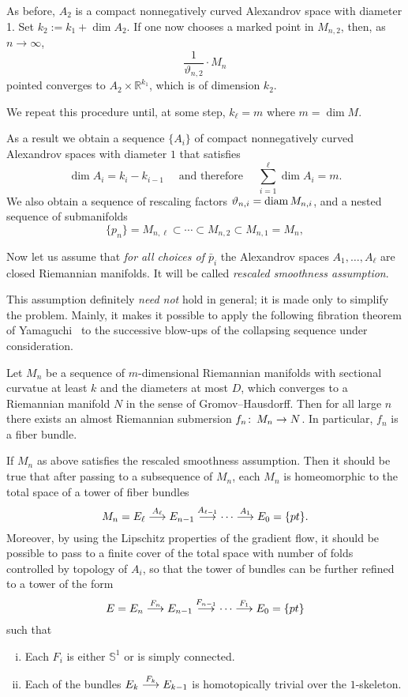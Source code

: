 \documentclass{amsart}
\begin{document}
As before, $A_2$ is a compact nonnegatively curved Alexandrov space with diameter 1.
Set $k_2:=k_1+\dim A_2$.
If one now chooses a marked point in $M_{n,2}$,
then, as $n\to\infty$,
$$\frac{1}{\vartheta_{n,2}}{\cdot} M_{n}$$ pointed converges to $A_2\times\mathbb{R}^{k_1}$,
which is of dimension $k_2$.

We repeat this procedure until, at some step, $k_\ell=m$ where $m=\dim M$.

\medskip

As a result we obtain a sequence $\{A_i\}$ of compact nonnegatively curved Alexandrov spaces
with diameter $1$ that satisfies
$$\dim A_i=k_i-k_{i-1} 
\quad\text{ and therefore }\quad
\sum_{i=1}^\ell\dim A_i=m.$$
We also obtain
a sequence of rescaling factors $\vartheta_{n,i}=\operatorname{\rm diam} M_{n,i}$,
and  a nested sequence of submanifolds
$$\{p_n\}=M_{n,\ell}\subset \cdots \subset M_{n,2}\subset M_{n,1}=M_n,$$

Now let us assume that \emph{for all choices of $\bar p_i$}
the Alexandrov spaces $A_1,\dots, A_\ell$ are closed  Riemannian manifolds.
It will be called \emph{rescaled smoothness assumption}.

This assumption definitely \emph{need not} hold in general;
it is made only to simplify the problem.
Mainly, it makes it possible to apply the following fibration theorem of Yamaguchi~\cite{Yam} to the successive blow-ups of the collapsing sequence under consideration.

\begin{thm}
Let $M_n$ be a sequence of $m$-dimensional Riemannian manifolds with sectional curvatue at least $k$ and the diameters at most $D$, which converges to a Riemannian manifold $N$ in the sense of Gromov--Hausdorff.
Then for all large $n$ there exists an almost Riemannian submersion $f_n\colon\thinspace M_n\to N$.
In particular, $f_n$ is a fiber bundle.
\end{thm}

If $M_n$ as above satisfies the rescaled smoothness assumption.
Then it should be true that after passing to a subsequence of $M_n$,
each $M_n$ is homeomorphic to the total space of a tower of fiber bundles
\[
M_n=E_\ell\buildrel {A_\ell}\over \longrightarrow E_{n-1}\buildrel {A_{\ell-1}}\over\longrightarrow\dots\buildrel {A_1}\over\longrightarrow E_0=\{pt\}.
\]
Moreover, by using the Lipschitz properties of the gradient flow,
it should be possible to pass to a finite cover of the total space with number of folds controlled by topology of $A_i$, so that the tower of bundles can be
further refined  to a tower of the form
\[
E=E_n\buildrel {F_n}\over \longrightarrow E_{n-1}\buildrel {F_{n-1}}\over\longrightarrow\dots\buildrel {F_1}\over\longrightarrow E_0=\{pt\}
\]
such that
\begin{enumerate}[(i)]
\item Each $F_i$ is either $\mathbb{S}^{1}$ or is simply connected. 
\item Each of the bundles $E_k\buildrel {F_k}\over \longrightarrow E_{k-1}$ is homotopically trivial over the $1$-skeleton. 
\end{enumerate}
\end{document}
